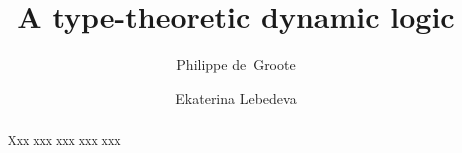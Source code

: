 \documentclass[a4paper]{article}
\title{A type-theoretic dynamic logic}
\author{Philippe de~Groote
\and
Ekaterina Lebedeva}
\date{}
\begin{document}
\maketitle

\begin{abstract}
Xxx xxx xxx xxx xxx
\end{abstract}













\end{document}
